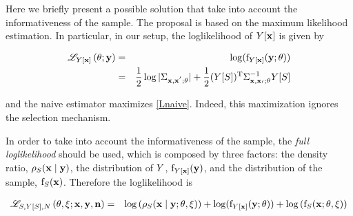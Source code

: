 
Here we briefly present a possible solution that take into account the informativeness  of the sample. The proposal is based on the maximum likelihood estimation. In particular, in our setup, the loglikelihood of $Y[\mathbf{x}]$ is given by 

\begin{eqnarray} \label{Lnaive}
\mathscr{L}_{Y[\mathbf{x}]}\left(\theta;\mathbf{y}\right)&=&\log(\mathrm{f}_{Y[\mathbf{x}]}(\mathbf{y};\theta))\\&=&
\frac12\log{|\Sigma_{\mathbf{x},\mathbf{x}^{'};\theta}|}
+\frac12(Y[S])^{\mathrm{T}}\Sigma_{\mathbf{x},\mathbf{x}_{'};\theta}^{-1}Y[S]
\end{eqnarray}

and the naive estimator maximizes \eqref{Lnaive}. Indeed, this maximization ignores the selection mechanism. 

In order to take into account the informativeness of the sample, the \emph{full loglikelihood} should be used, which is composed by three factors: the density ratio, $\rho_{S}(\mathbf{x}\mid\mathbf{y})$, the distribution of $Y$, $\mathrm{f}_{Y[\mathbf{x}]}(\mathbf{y})$, and the distribution of the sample, $\mathrm{f}_S(\mathbf{x})$. Therefore the loglikelihood is 

\begin{eqnarray} \label{fit:ML2}
\mathscr{L}_{S,Y[S],N}\left(\theta,\xi;\mathbf{x},\mathbf{y},\mathbf{n}\right)&=&\log\left(\rho_{S}(\mathbf{x}\mid\mathbf{y};\theta,\xi)\right)+\log(\mathrm{f}_{Y[\mathbf{x}]}(\mathbf{y};\theta))+\log\left(\mathrm{f}_S(\mathbf{x};\theta,\xi)\right)
\end{eqnarray}



